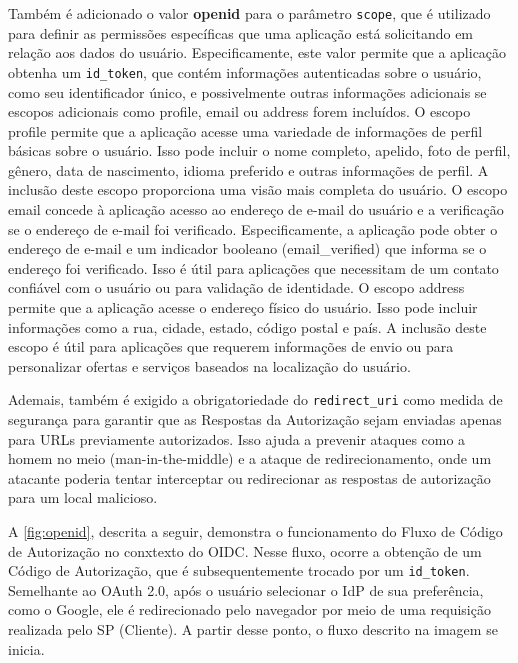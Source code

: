 Também é adicionado o valor \textbf{openid} para o parâmetro \texttt{scope}, que é utilizado para definir as permissões específicas que uma aplicação está solicitando em relação aos dados do usuário. Especificamente, este valor permite que a aplicação obtenha um \texttt{id\_token}, que contém informações autenticadas sobre o usuário, como seu identificador único, e possivelmente outras informações adicionais se escopos adicionais como profile, email ou address forem incluídos. O escopo profile permite que a aplicação acesse uma variedade de informações de perfil básicas sobre o usuário. Isso pode incluir o nome completo, apelido, foto de perfil, gênero, data de nascimento, idioma preferido e outras informações de perfil. A inclusão deste escopo proporciona uma visão mais completa do usuário. O escopo email concede à aplicação acesso ao endereço de e-mail do usuário e a verificação se o endereço de e-mail foi verificado. Especificamente, a aplicação pode obter o endereço de e-mail e um indicador booleano (email\_verified) que informa se o endereço foi verificado. Isso é útil para aplicações que necessitam de um contato confiável com o usuário ou para validação de identidade. O escopo address permite que a aplicação acesse o endereço físico do usuário. Isso pode incluir informações como a rua, cidade, estado, código postal e país. A inclusão deste escopo é útil para aplicações que requerem informações de envio ou para personalizar ofertas e serviços baseados na localização do usuário.

Ademais, também é exigido a obrigatoriedade do \texttt{redirect\_uri} como medida de segurança para garantir que as Respostas da Autorização sejam enviadas apenas para URLs previamente autorizados. Isso ajuda a prevenir ataques como a homem no meio (man-in-the-middle) e a ataque de redirecionamento, onde um atacante poderia tentar interceptar ou redirecionar as respostas de autorização para um local malicioso. 

A \autoref{fig:openid}, descrita a seguir, demonstra o funcionamento do Fluxo de Código de Autorização no conxtexto do \acs{OIDC}. Nesse fluxo, ocorre a obtenção de um Código de Autorização, que é subsequentemente trocado por um \texttt{id\_token}.
Semelhante ao OAuth 2.0, após o usuário selecionar o \acs{IdP} de sua preferência, como o Google, ele é redirecionado pelo navegador por meio de uma requisição realizada pelo \acs{SP} (Cliente). A partir desse ponto, o fluxo descrito na imagem se inicia.



